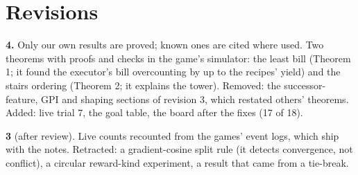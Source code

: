 \section*{Revisions}
\textbf{4.} Only our own results are proved; known ones are cited where used. Two theorems with proofs and checks in
the game's simulator: the least bill (Theorem 1; it found the executor's bill overcounting by up to the recipes'
yield) and the stairs ordering (Theorem 2; it explains the tower). Removed: the successor-feature, GPI and shaping
sections of revision 3, which restated others' theorems. Added: live trial 7, the goal table, the board after the
fixes (17 of 18).

\textbf{3} (after review). Live counts recounted from the games' event logs, which ship with the notes. Retracted: a
gradient-cosine split rule (it detects convergence, not conflict), a circular reward-kind experiment, a result that came
from a tie-break.

